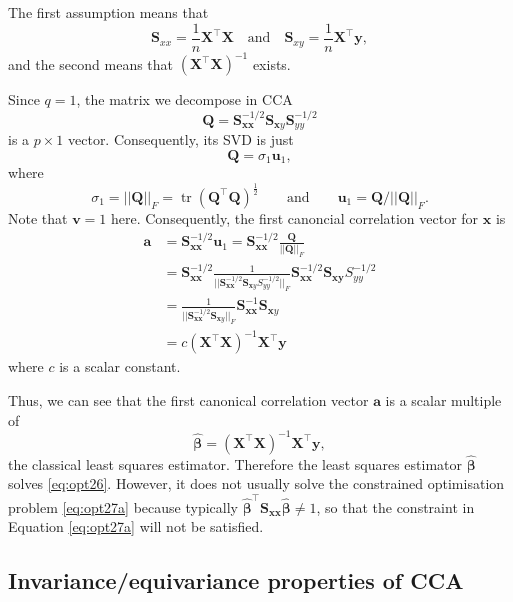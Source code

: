 \documentclass[
]{book}
\theoremstyle{definition}
\theoremstyle{definition}
\theoremstyle{definition}
\theoremstyle{definition}
\theoremstyle{remark}
\begin{document}
The first assumption means that
\[\mathbf S_{xx}=\frac{1}{n}\mathbf X^\top \mathbf X\quad \mbox{and}\quad \mathbf S_{xy}=\frac{1}{n}\mathbf X^\top \mathbf y,\] and the second means that \((\mathbf X^\top \mathbf X)^{-1}\) exists.

Since \(q=1\), the matrix we decompose in CCA
\[
\mathbf Q=\mathbf S_{\mathbf x\mathbf x}^{-1/2} \mathbf S_{\mathbf xy}\mathbf S_{yy}^{-1/2}
\]
is a \(p \times 1\) vector. Consequently, its
SVD is just
\[
\mathbf Q=\sigma_1 \mathbf u_1,
\]
where
\[
\sigma_1=\vert \vert \mathbf Q\vert \vert_F = \operatorname{tr}(\mathbf Q^\top \mathbf Q)^{\frac{1}{2}} \qquad \text{and} \qquad \mathbf u_1=\mathbf Q/\vert \vert \mathbf Q\vert \vert_F.
\]
Note that \(\mathbf v=1\) here.
Consequently, the first canoncial correlation vector for \(\mathbf x\) is
\begin{align*}
\mathbf a&=\mathbf S_{\mathbf x\mathbf x}^{-1/2}\mathbf u_1 =\mathbf S_{\mathbf x\mathbf x}^{-1/2} \frac{\mathbf Q}{||\mathbf Q||_F}\\
&=\mathbf S_{\mathbf x\mathbf x}^{-1/2} \frac{1}{\vert \vert \mathbf S_{\mathbf x\mathbf x}^{-1/2}\mathbf S_{\mathbf xy}S_{yy}^{-1/2}\vert \vert_F}\mathbf S_{\mathbf x\mathbf x}^{-1/2}\mathbf S_{\mathbf x\mathbf y}S_{yy}^{-1/2}\\
&=\frac{1}{\vert \vert \mathbf S_{\mathbf x\mathbf x}^{-1/2}\mathbf S_{\mathbf xy}\vert \vert_F}\mathbf S_{\mathbf x\mathbf x}^{-1}\mathbf S_{\mathbf xy}\\
&= c (\mathbf X^\top \mathbf X)^{-1}\mathbf X^\top \mathbf y
\end{align*}
where \(c\) is a scalar constant.

Thus, we can see that the first canonical correlation vector \(\mathbf a\) is a scalar multiple of
\[
\hat{\pmb \beta}=\left ( \mathbf X^\top \mathbf X\right )^{-1} \mathbf X^\top \mathbf y,
\]
the classical least squares estimator. Therefore the least squares estimator \(\hat{\pmb \beta}\) solves \eqref{eq:opt26}. However, it does not usually solve the constrained optimisation problem \eqref{eq:opt27a} because typically \(\hat{\pmb \beta}^\top \mathbf S_{\mathbf x\mathbf x}\hat{\pmb \beta} \not= 1\), so that the constraint in Equation \eqref{eq:opt27a} will not be satisfied.

\hypertarget{invarianceequivariance-properties-of-cca}{%
\subsection{Invariance/equivariance properties of CCA}\label{invarianceequivariance-properties-of-cca}}
\end{document}
